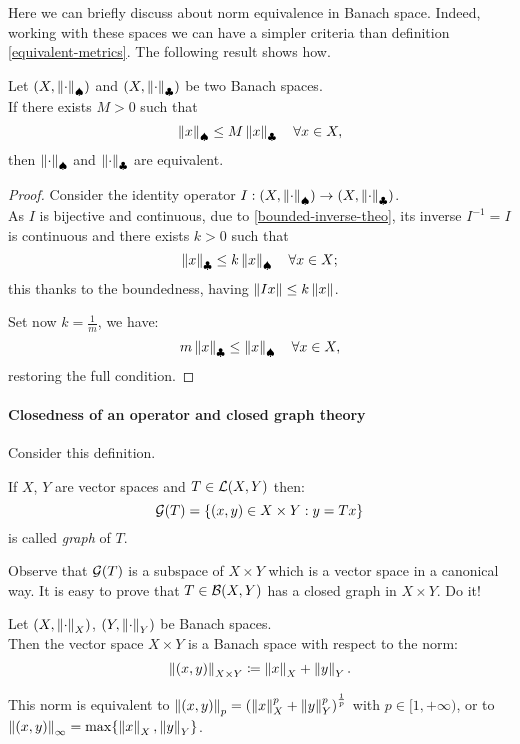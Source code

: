 Here we can briefly discuss about norm equivalence in Banach space. Indeed, working with these spaces we can have a simpler criteria than definition \vref{equivalent-metrics}. The following result shows how.

\begin{coro} \label{coro-equiv-norm-banach}
	Let $(X,\left\lVert\cdot\right\rVert_\spadesuit)$ and $(X, \left\lVert\cdot\right\rVert_\clubsuit)$ be two Banach spaces. \\
	If there exists $M > 0$ such that 
	$$
		\left\lVert x\right\rVert_\spadesuit 
		\leq M \left\lVert x\right\rVert_\clubsuit 
		\quad \forall x \in X
		,
	$$
	then $\left\lVert\cdot\right\rVert_\spadesuit$ and $\left\lVert\cdot\right\rVert_\clubsuit$ are equivalent.
\end{coro}

\begin{proof}
	Consider the identity operator $I:(X, \left\lVert\cdot\right\rVert_\spadesuit) \to (X, \left\lVert\cdot\right\rVert_\clubsuit)$. \\
	As $I$ is bijective and continuous, due to \vref{bounded-inverse-theo}, its inverse $I^{-1} = I$ is continuous and there exists $k>0$ such that
	$$
		\left\lVert x\right\rVert_\clubsuit 
		\leq k \left\lVert x\right\rVert_\spadesuit 
		\quad \forall x \in X
	;
	$$
	this thanks to the boundedness, having $\left\lVert I x\right\rVert \leq k \left\lVert x\right\rVert$.
	
	Set now $k = \frac{1}{m}$, we have:
	$$
		m \left\lVert x\right\rVert_\clubsuit 
		\leq \left\lVert x\right\rVert_\spadesuit 
		\quad \forall x \in X
	,
	$$
	restoring the full condition.
\end{proof}

\paragraph{Closedness of an operator and closed graph theory} Consider this definition.

\begin{defn}
	If $X$, $Y$ are vector spaces and $T \in \mathcal L(X,Y)$ then:
	$$ \mathcal G(T) = \{(x,y) \in X \times Y : y = Tx\}$$
	is called \emph{graph} of $T$.
\end{defn}

Observe that $\mathcal G(T)$ is a subspace of $X \times Y$ which is a vector space in a canonical way.
It is easy to prove that $T \in \mathcal B(X,Y)$ has a closed graph in $X \times Y$. Do it!

\begin{prop}
	Let $(X,\left\lVert\cdot\right\rVert_X)$, $(Y,\left\lVert\cdot\right\rVert_Y)$ be Banach spaces.\\
	Then the vector space $X \times Y$ is a Banach space with respect to the norm:
	$$ \left\lVert(x,y)\right\rVert_{X\times Y} \coloneqq \left\lVert x\right\rVert_X + \left\lVert y\right\rVert_Y.$$
\end{prop}
This norm is equivalent to $\left\lVert(x,y)\right\rVert_{p} = \left(\left\lVert x\right\rVert_X^p+\left\lVert y\right\rVert_Y^p\right)^{\frac 1 p}$ with $p \in [1, +\infty)$, or to $\left\lVert(x,y)\right\rVert_\infty = \max\{\left\lVert x\right\rVert_X, \left\lVert y\right\rVert_Y\}$.

